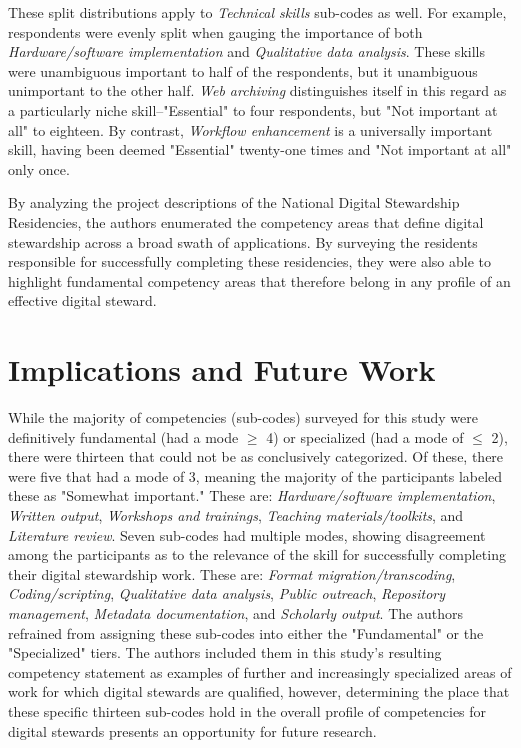 \documentclass{acm_proc_article-sp}
\begin{document}
These split distributions apply to \textit{Technical skills} sub-codes as well. For example, respondents were evenly split when gauging the importance of both \textit{Hardware/software implementation} and \textit{Qualitative data analysis}. These skills were unambiguous important to half of the respondents, but it unambiguous unimportant to the other half. \textit{Web archiving} distinguishes itself in this regard as a particularly niche skill--"Essential" to four respondents, but "Not important at all" to eighteen. By contrast, \textit{Workflow enhancement} is a universally important skill, having been deemed "Essential" twenty-one times and "Not important at all" only once.   

By analyzing the project descriptions of the National Digital Stewardship Residencies, the authors enumerated the competency areas that define digital stewardship across a broad swath of applications. By surveying the residents responsible for successfully completing these residencies, they were also able to highlight fundamental competency areas that therefore belong in any profile of an effective digital steward.

\section{Implications and Future Work}
While the majority of competencies (sub-codes) surveyed for this study were definitively fundamental (had a mode $\geq$ 4) or specialized (had a mode of $\leq$ 2), there were thirteen that could not be as conclusively categorized. Of these, there were five that had a mode of 3, meaning the majority of the participants labeled these as "Somewhat important." These are: \textit{Hardware/software implementation}, \textit{Written output}, \textit{Workshops and trainings}, \textit{Teaching materials/toolkits}, and \textit{Literature review}. Seven sub-codes had multiple modes, showing disagreement among the participants as to the relevance of the skill for successfully completing their digital stewardship work. These are: \textit{Format migration/transcoding}, \textit{Coding/scripting}, \textit{Qualitative data analysis}, \textit{Public outreach}, \textit{Repository management}, \textit{Metadata documentation}, and \textit{Scholarly output}. The authors refrained from assigning these sub-codes into either the "Fundamental" or the "Specialized" tiers. The authors included them in this study's resulting competency statement as examples of further and increasingly specialized areas of work for which digital stewards are qualified, however, determining the place that these specific thirteen sub-codes hold in the overall profile of competencies for digital stewards presents an opportunity for future research.
\end{document}
